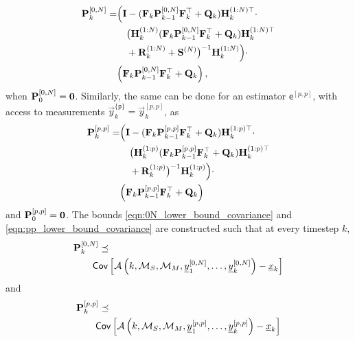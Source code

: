 \begin{equation}\label{eqn:0N_lower_bound_covariance}
  \begin{split}
    {\ensuremath{{\mathbf{P}}}}_k^{[0,N]} =& \Bigl( {{\mathbf{I}}} - ({{\mathbf{F}}}_k{{\mathbf{P}}}_{k-1}^{[0,N]}{{\mathbf{F}}}_k^\top + {{\mathbf{Q}}}_k){{\mathbf{H}}}_k^{(1:N)\top} \cdot \\
    &\quad\bigl({{\mathbf{H}}}_k^{(1:N)}({{\mathbf{F}}}_k{{\mathbf{P}}}_{k-1}^{[0,N]}{{\mathbf{F}}}_k^\top + {{\mathbf{Q}}}_k){{\mathbf{H}}}_k^{(1:N)\top} \\
    &\quad+ {{\mathbf{R}}}_k^{(1:N)} + {{\mathbf{S}}}^{(N)}\bigr)^{-1}{{\mathbf{H}}}_k^{(1:N)}\Bigr)\cdot\\
    &\Bigl({{\mathbf{F}}}_k{{\mathbf{P}}}_{k-1}^{[0,N]}{{\mathbf{F}}}_k^\top + {{\mathbf{Q}}}_k\Bigr)\,,
 \end{split}
\end{equation}
when ${{\mathbf{P}}}_0^{[0,N]}={{\mathbf{0}}}$. Similarly, the same can be done for an estimator $\mathsf{e}^{[p,p]}$, with access to measurements $\vec{y}_k^{\{\mathsf{p}\}}=\vec{y}_k^{[p,p]}$, as
\begin{equation}\label{eqn:pp_lower_bound_covariance}
  \begin{split}
    {\ensuremath{{\mathbf{P}}}}_k^{[p,p]} =& \Bigl( {{\mathbf{I}}} - ({{\mathbf{F}}}_k{{\mathbf{P}}}_{k-1}^{[p,p]}{{\mathbf{F}}}_k^\top + {{\mathbf{Q}}}_k){{\mathbf{H}}}_k^{(1:p)\top} \cdot \\
    &\quad\bigl({{\mathbf{H}}}_k^{(1:p)}({{\mathbf{F}}}_k{{\mathbf{P}}}_{k-1}^{[p,p]}{{\mathbf{F}}}_k^\top + {{\mathbf{Q}}}_k){{\mathbf{H}}}_k^{(1:p)\top} \\
    &\quad+ {{\mathbf{R}}}_k^{(1:p)}\bigr)^{-1}{{\mathbf{H}}}_k^{(1:p)}\Bigr)\cdot\\
    &\Bigl({{\mathbf{F}}}_k{{\mathbf{P}}}_{k-1}^{[p,p]}{{\mathbf{F}}}_k^\top + {{\mathbf{Q}}}_k\Bigr)
  \end{split}
\end{equation}
and ${{\mathbf{P}}}_0^{[p,p]}={{\mathbf{0}}}$. The bounds \eqref{eqn:0N_lower_bound_covariance} and \eqref{eqn:pp_lower_bound_covariance} are constructed such that at every timestep $k$,
\begin{equation}\label{eqn:0N_cov_bound}
  \begin{split}
    &{{\mathbf{P}}}_k^{[0,N]} \preceq\\
    &\qquad \mathsf{Cov}\left[\mathcal{A}\left(k,\mathcal{M}_S,\mathcal{M}_M,{\underline{y}}_1^{[0,N]},\dots,{\underline{y}}_k^{[0,N]}\right) - {\underline{x}}_k\right]
  \end{split}
\end{equation}
and
\begin{equation}\label{eqn:pp_cov_bound}
  \begin{split}
    &{{\mathbf{P}}}_k^{[p,p]} \preceq\\
    &\qquad \mathsf{Cov}\left[\mathcal{A}\left(k,\mathcal{M}_S,\mathcal{M}_M,{\underline{y}}_1^{[p,p]},\dots,{\underline{y}}_k^{[p,p]}\right) - {\underline{x}}_k\right]
  \end{split}
\end{equation}
